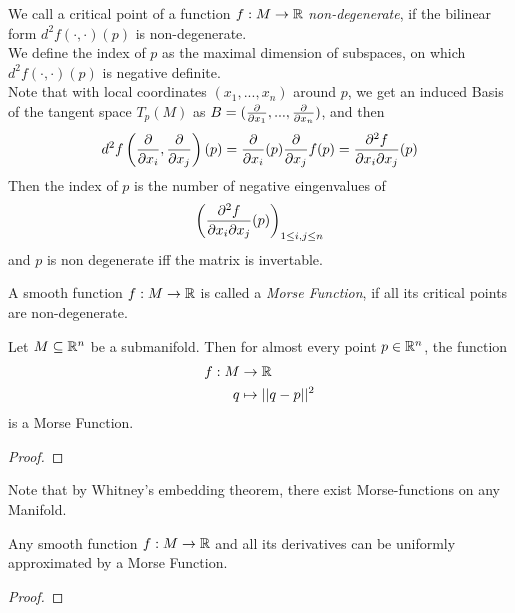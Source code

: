 \begin{definition}
    We call a critical point of a function $f: M \to \R$ \textit{non-degenerate}, if
    the bilinear form $d^2 f(\cdot, \cdot)(p)$ is non-degenerate. \\
    We define the index of $p$ as the maximal dimension of subspaces, on which 
    $d^2 f (\cdot, \cdot) (p)$ is negative definite.\\
    Note that with local coordinates $(x_1, ..., x_n)$ around $p$, we get an induced Basis 
    of the tangent space $T_p(M)$ as $B = (\pderive{x_1}, ..., \pderive{x_n})$, and then
    \[ 
        d^2 f \left(\pderive{x_i}, \pderive{x_j}\right)(p) 
        = \pderive{x_i}(p)\pderive{x_j}f (p) 
        = \pdderive[f]{x_i}{x_j}(p) 
    \]
    Then the index of $p$ is the number of negative eingenvalues of 
    \[ \left(\pdderive[f]{x_i}{x_j}(p)\right)_{1 \leq i, j \leq n} \]
    and $p$ is non degenerate iff the matrix is invertable.
\end{definition}

\begin{definition}
    A smooth function $f: M \to \R$ is called a \textit{Morse Function}, if all its critical
    points are non-degenerate.
\end{definition}

\begin{lemma}
    Let $M \subseteq \R^n$ be a submanifold. Then for almost every point $p \in \R^n$,
    the function
    \begin{align*}
        f: M & \to \R \\
        q & \mapsto || q - p ||^2
    \end{align*}
    is a Morse Function.
\end{lemma}

\begin{proof}
\end{proof}

\begin{remark}
    Note that by Whitney's embedding theorem, there exist Morse-functions on any Manifold.
\end{remark}

\begin{theorem}
    Any smooth function $f: M \to \R$ and all its derivatives can be uniformly approximated
    by a Morse Function.
\end{theorem}

\begin{proof}
\end{proof}

